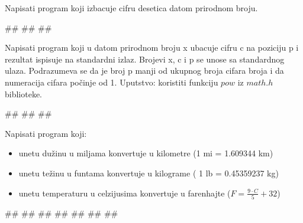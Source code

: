 \begin{Exercise}[label=p1_08] 
Napisati program koji izbacuje cifru desetica datom prirodnom broju. \\
\begin{miditest}
\begin{upotreba}{1}
#\naslovInt#
##
##
\end{upotreba}
\end{miditest}
\end{Exercise}
\begin{Answer}[ref=p1_08]
\end{Answer}


\begin{Exercise}[label=p1_09] 
Napisati program koji u datom prirodnom broju x ubacuje cifru c
na poziciju p i rezultat ispisuje na standardni izlaz. Brojevi x, c i p se unose sa standardnog ulaza. Podrazumeva se da je broj p manji od ukupnog broja cifara broja i da numeracija cifara počinje od 1. Uputstvo: koristiti funkciju $pow$ iz $math.h$ biblioteke.\\
\begin{miditest}
\begin{upotreba}{1}
#\naslovInt#
##
##
\end{upotreba}
\end{miditest}
\end{Exercise}
\begin{Answer}[ref=p1_09]
\end{Answer}


\begin{Exercise}[label=p1_10] 
Napisati program koji:
\begin{itemize}
\item unetu dužinu u miljama konvertuje u kilometre (1 mi = 1.609344 km)
\item unetu težinu u funtama konvertuje u kilograme ( 1 lb = 0.45359237 kg)
\item unetu temperaturu u celzijusima konvertuje u farenhajte ($F=\frac{9\cdot C}{5}+32$)
\end{itemize}

\begin{maxitest}
\begin{upotreba}{1}
#\naslovInt#
##
##
##
##
##
##
\end{upotreba}
\end{maxitest}
\end{Exercise}
\begin{Answer}[ref=p1_10]
\end{Answer}

